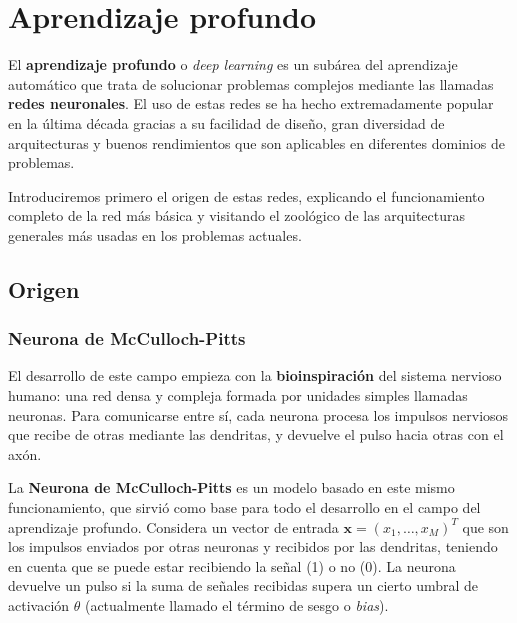 %

\chapter{Aprendizaje profundo}\label{ch:dl}

El \textbf{aprendizaje profundo} o \emph{deep learning} es un subárea del aprendizaje automático que trata de solucionar problemas complejos mediante las llamadas \textbf{redes neuronales}. El uso de estas redes se ha hecho extremadamente popular en la última década gracias a su facilidad de diseño, gran diversidad de arquitecturas y buenos rendimientos que son aplicables en diferentes dominios de problemas.

Introduciremos primero el origen de estas redes, explicando el funcionamiento completo de la red más básica y visitando el zoológico de las arquitecturas generales más usadas en los problemas actuales.

\section{Origen}

\subsection{Neurona de McCulloch-Pitts}

El desarrollo de este campo empieza con la \textbf{bioinspiración} del sistema nervioso humano: una red densa y compleja formada por unidades simples llamadas neuronas. Para comunicarse entre sí, cada neurona procesa los impulsos nerviosos que recibe de otras mediante las dendritas, y devuelve el pulso hacia otras con el axón.

La \textbf{Neurona de McCulloch-Pitts} \cite{mcculloch1943logical} es un modelo basado en este mismo funcionamiento, que sirvió como base para todo el desarrollo en el campo del aprendizaje profundo. Considera un vector de entrada $\textbf{x} = (x_1, \ldots, x_M)^T$ que son los impulsos enviados por otras neuronas y recibidos por las dendritas, teniendo en cuenta que se puede estar recibiendo la señal (1) o no (0). La neurona devuelve un pulso si la suma de señales recibidas supera un cierto umbral de activación $\theta$ (actualmente llamado el término de sesgo o \emph{bias}).

